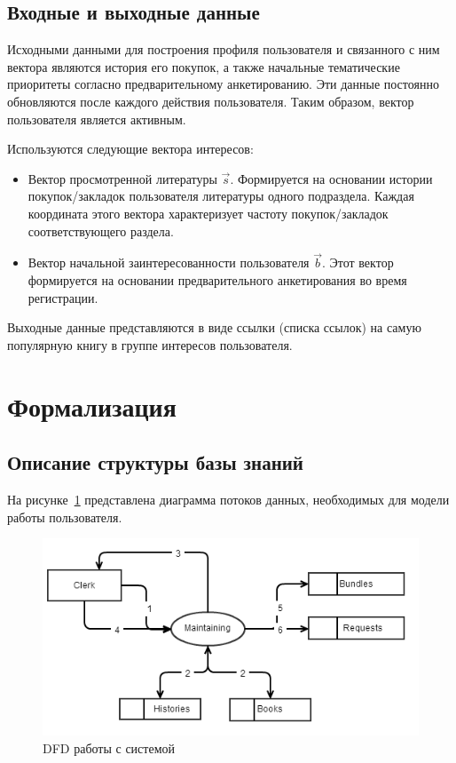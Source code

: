 \documentclass[simple,14pt,utf8,russian]{eskdtext}
\begin{document}
    \subsection{Входные и выходные данные}
    \label{sec:io}
        Исходными данными для построения профиля пользователя и связанного с ним вектора являются история его покупок,
        а также начальные тематические приоритеты согласно предварительному анкетированию.
        Эти данные постоянно обновляются после каждого действия пользователя.
        Таким образом, вектор пользователя является активным.

        Используются следующие вектора интересов:
        \begin{itemize}
            \item Вектор просмотренной литературы $\vec{s}$.
                Формируется на основании истории покупок/закладок пользователя литературы одного подраздела.
                Каждая координата этого вектора характеризует частоту покупок/закладок соответствующего раздела.
            \item Вектор начальной заинтересованности пользователя $\vec{b}$.
                Этот вектор формируется на основании предварительного анкетирования во время регистрации.
        \end{itemize}

        Выходные данные представляются в виде ссылки (списка ссылок) на самую популярную книгу в группе интересов
        пользователя.
    \clearpage
\section{Формализация}
\label{chap:formal}
    \subsection{Описание структуры базы знаний}
    На рисунке~\ref{fig:dfd} представлена диаграмма потоков данных, необходимых для модели работы пользователя.
    \label{sec:base}
        \begin{figure}[h]
            \includegraphics[width=\textwidth]{dfd.png}
            \caption{DFD работы с системой}
            \label{fig:dfd}
        \end{figure}
\end{document}
